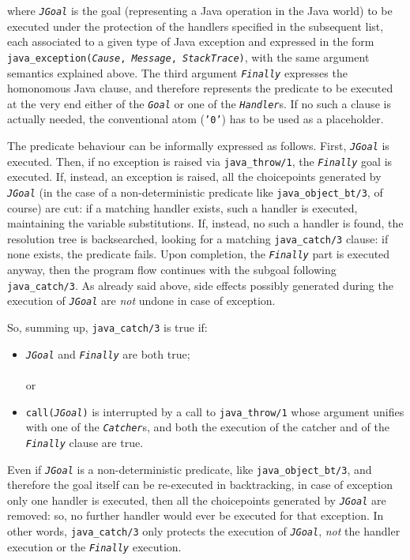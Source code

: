\medskip
\noindent where \texttt{\textit{JGoal}} is the goal (representing a Java operation in the Java
world) to be executed under the protection of the handlers specified in the subsequent list, each
associated to a given type of Java exception and expressed in the form
\texttt{java\_exception(\textit{Cause}, \textit{Message}, \textit{StackTrace})}, with the same
argument semantics explained above. The third argument \texttt{\textit{Finally}} expresses the
homonomous Java clause, and therefore represents the predicate to be executed at the very end
either of the \texttt{\textit{Goal}} or one of the \texttt{\textit{Handler}}s. If no such a clause
is actually needed, the conventional atom (\texttt{'0'}) has to be used as a placeholder.

The predicate behaviour can be informally expressed as follows. First, \textit{\texttt{JGoal}} is
executed. Then, if no exception is raised via \texttt{java\_throw/1}, the
\texttt{\textit{Finally}} goal is executed. If, instead, an exception is raised, all the
choicepoints generated by \textit{\texttt{JGoal}} (in the case of a non-deterministic predicate
like \texttt{java\_object\_bt/3}, of course) are cut: if a matching handler exists, such a handler
is executed, maintaining the variable substitutions. If, instead, no such a handler is found, the
resolution tree is backsearched, looking for a matching \texttt{java\_catch/3} clause: if none
exists, the predicate fails. Upon completion, the \texttt{\textit{Finally}} part is executed
anyway, then the program flow continues with the subgoal following \texttt{java\_catch/3}. As
already said above, side effects possibly generated during the execution of
\textit{\texttt{JGoal}} are \textit{not} undone in case of exception.

So, summing up, \texttt{java\_catch/3} is true if:
\begin{itemize}
  \item \texttt{\textit{JGoal}} and \texttt{\textit{Finally}} are both true;\\\\or
  \item \texttt{call(\textit{JGoal})} is interrupted by a call to \texttt{java\_throw/1} whose
      argument unifies with one of the \texttt{\textit{Catcher}}s, and both the execution of
      the catcher and of the \texttt{\textit{Finally}} clause are true.
\end{itemize}

Even if \texttt{\textit{JGoal}} is a non-deterministic predicate, like
\texttt{java\_object\_bt/3}, and therefore the goal itself can be re-executed in backtracking, in
case of exception only one handler is executed, then all the choicepoints generated by
\texttt{\textit{JGoal}} are removed: so, no further handler would ever be executed for that
exception. In other words, \texttt{java\_catch/3} only protects the execution of
\texttt{\textit{JGoal}}, \textit{not} the handler execution or the \texttt{\textit{Finally}}
execution.

